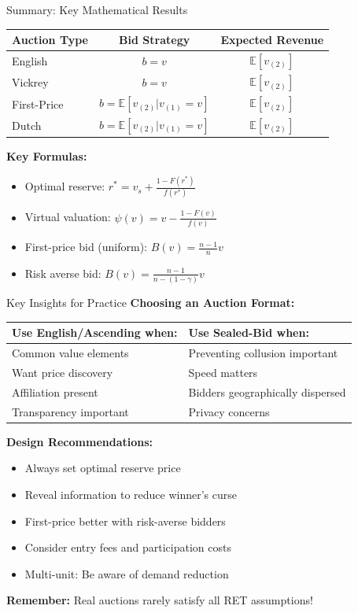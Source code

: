 \documentclass[xcolor={x11names}]{beamer}
\newcommand{\E}{\mathbb{E}}
\begin{document}
\begin{frame}{Summary: Key Mathematical Results}
\begin{center}
\begin{tabular}{lcc}
\toprule
\textbf{Auction Type} & \textbf{Bid Strategy} & \textbf{Expected Revenue} \\
\midrule
English & $b = v$ & $\E[v_{(2)}]$ \\
Vickrey & $b = v$ & $\E[v_{(2)}]$ \\
First-Price & $b = \E[v_{(2)} | v_{(1)} = v]$ & $\E[v_{(2)}]$ \\
Dutch & $b = \E[v_{(2)} | v_{(1)} = v]$ & $\E[v_{(2)}]$ \\
\bottomrule
\end{tabular}
\end{center}


\textbf{Key Formulas:}
\begin{itemize}
  \item Optimal reserve: $r^* = v_s + \frac{1-F(r^*)}{f(r^*)}$
  \item Virtual valuation: $\psi(v) = v - \frac{1-F(v)}{f(v)}$
  \item First-price bid (uniform): $B(v) = \frac{n-1}{n}v$
  \item Risk averse bid: $B(v) = \frac{n-1}{n-(1-\gamma)}v$
\end{itemize}
\end{frame}

\begin{frame}{Key Insights for Practice}
\textbf{Choosing an Auction Format:}

\begin{tabular}{ll}
\toprule
\textbf{Use English/Ascending when:} & \textbf{Use Sealed-Bid when:} \\
\midrule
Common value elements & Preventing collusion important \\
Want price discovery & Speed matters \\
Affiliation present & Bidders geographically dispersed \\
Transparency important & Privacy concerns \\
\bottomrule
\end{tabular}


\textbf{Design Recommendations:}
\begin{itemize}
  \item Always set optimal reserve price
  \item Reveal information to reduce winner's curse
  \item First-price better with risk-averse bidders
  \item Consider entry fees and participation costs
  \item Multi-unit: Be aware of demand reduction
\end{itemize}

\textbf{Remember:} Real auctions rarely satisfy all RET assumptions!
\end{frame}
\end{document}
